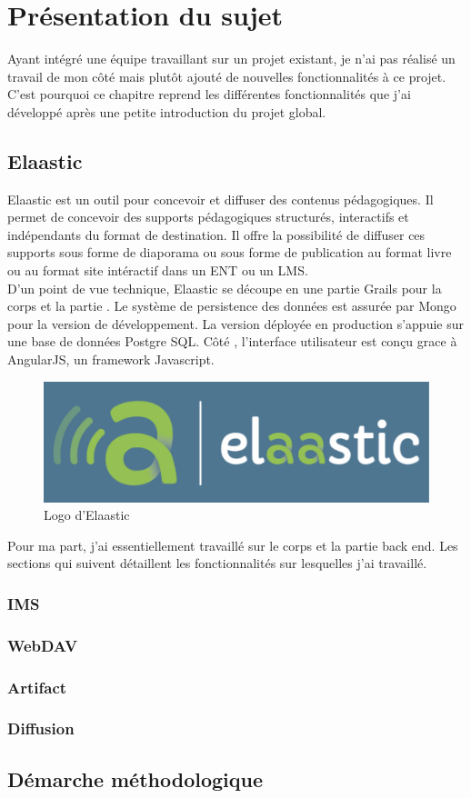 \chapter{Présentation du sujet}
Ayant intégré une équipe travaillant sur un projet existant, je n'ai pas réalisé
un travail de mon côté mais plutôt ajouté de nouvelles fonctionnalités à ce
projet. C'est pourquoi ce chapitre reprend les différentes fonctionnalités que
j'ai développé après une petite introduction du projet global.
\section{Elaastic}
Elaastic est un outil pour concevoir et diffuser des contenus pédagogiques. Il
permet de concevoir des supports pédagogiques structurés, interactifs et
indépendants du format de destination. Il offre la possibilité de diffuser ces
supports sous forme de diaporama ou sous forme de publication au format livre ou
au format site intéractif dans un ENT ou un LMS.\\

D'un point de vue technique, Elaastic se découpe en une partie Grails pour la
corps et la partie . Le système de persistence des données est
assurée par Mongo pour la version de développement. La version déployée en
production s'appuie sur une base de données Postgre SQL. Côté ,
l'interface utilisateur est conçu grace à AngularJS, un framework Javascript.

\begin{figure}[h]
  \centering
  \includegraphics[scale=0.4]{images/elaastic_blue.pdf}%
  \caption{Logo d'Elaastic}
  \label{fig:elaastic}
\end{figure}

Pour ma part, j'ai essentiellement travaillé sur le corps et la partie back end.
Les sections qui suivent détaillent les fonctionnalités sur lesquelles j'ai
travaillé.

\subsection{IMS}
\subsection{WebDAV}
\subsection{Artifact}
\subsection{Diffusion}

\section{Démarche méthodologique} %
